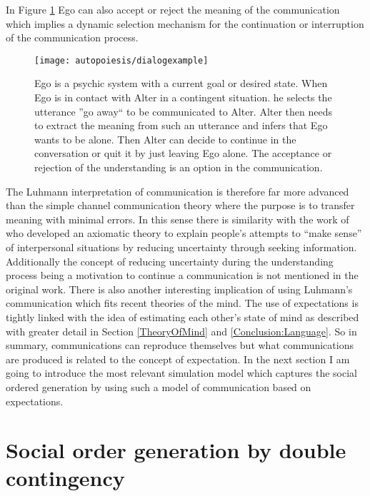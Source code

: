 In Figure \ref{Fig:Autopoiesis:CommExample} Ego can also accept or reject the
meaning of the communication which implies a dynamic selection mechanism for
the continuation or interruption of the communication process.

\begin{figure}[htbp]
\begin{center}
\texttt{[image: autopoiesis/dialogexample]}
\end{center}
\small{
\caption[Communication between alter and ego]{
Ego is a psychic system with a current goal or desired state.
When Ego is in contact with Alter in a contingent situation. he selects the utterance 
''go away`` to be communicated to Alter. Alter then needs to extract the 
meaning from such an utterance and infers that Ego wants to be alone. 
Then Alter can decide to continue in the conversation or quit it by just leaving
 Ego alone.
The acceptance or rejection of the understanding is an option in the communication.
\label{Fig:Autopoiesis:CommExample}}}
\end{figure}

The Luhmann interpretation of communication is therefore far more advanced
than the simple channel communication theory where the purpose is to transfer
meaning with minimal errors.
In this sense there is similarity with the work of \citep{Berger1975:URT} 
who developed an axiomatic theory to explain people's attempts to “make sense” of interpersonal
situations by reducing uncertainty through seeking information.
Additionally the concept of reducing uncertainty
during the understanding process being a motivation to continue a communication 
is not mentioned in the original work.
There is also another interesting implication of using Luhmann's communication 
which fits recent theories of the mind.
The use of expectations is tightly linked with the idea of estimating each other's
state of mind as described with greater detail in Section \ref{TheoryOfMind} and \ref{Conclusion:Language}.
So in summary, communications can reproduce themselves but what communications
are produced is related to the concept of expectation.
In the next section I am going to introduce the most relevant simulation model 
which captures the social ordered generation by using such a model of communication 
based on expectations.

\section{Social order generation by double contingency \label{Introduction:SocialOrderModel}}

